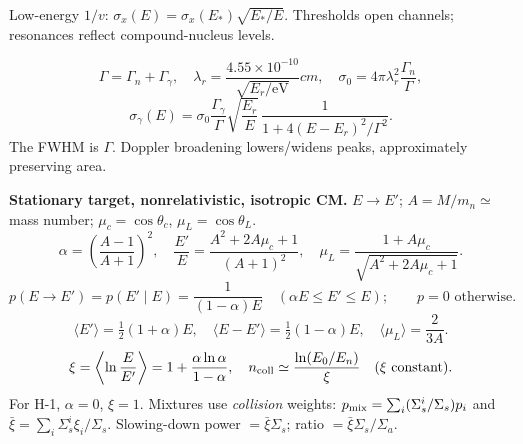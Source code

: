 \begin{handoutcolumns}
Low-energy $1/v$: $\sigma_x(E)=\sigma_x(E_*)\sqrt{E_*/E}$.
Thresholds open channels; resonances reflect compound-nucleus levels.

\[
 \Gamma=\Gamma_n+\Gamma_\gamma,\quad
 \lambda_r=\frac{4.55\times10^{-10}}{\sqrt{E_r/\mathrm{eV}}}\unit{cm},
 \quad \sigma_0=4\pi\lambda_r^2\frac{\Gamma_n}{\Gamma},
\]
\[
 \sigma_\gamma(E)=\sigma_0\frac{\Gamma_\gamma}{\Gamma}
 \sqrt{\frac{E_r}{E}}\,
 \frac{1}{1+4(E-E_r)^2/\Gamma^2}.
\]
The FWHM
is $\Gamma$. Doppler broadening lowers/widens peaks, approximately
preserving area.

\textbf{Stationary target, nonrelativistic, isotropic CM.}
$E\to E'$; $A=M/m_n\simeq$ mass number;
$\mu_c=\cos\theta_c$, $\mu_L=\cos\theta_L$.
\[
 \alpha=\left(\frac{A-1}{A+1}\right)^2,\quad
 \frac{E'}E=\frac{A^2+2A\mu_c+1}{(A+1)^2},\quad
 \mu_L=\frac{1+A\mu_c}{\sqrt{A^2+2A\mu_c+1}}.
\]
\[
 p(E\to E') = p(E'\mid E)=\frac{1}{(1-\alpha)E}\quad(\alpha E\le E'\le E);
 \qquad p=0\text{ otherwise}.
\]
\[
 \langle E'\rangle=\tfrac12(1+\alpha)E,\quad
 \langle E-E'\rangle=\tfrac12(1-\alpha)E,\quad
 \langle\mu_L\rangle=\frac{2}{3A}.
\]
\[
 \xi=\left\langle\ln\frac{E}{E'}\right\rangle
 =1+\frac{\alpha\ln\alpha}{1-\alpha},\quad
 n_{\rm coll}\simeq\frac{\ln(E_0/E_n)}{\xi}\quad(\xi\text{ constant}).
\]
For H-1, $\alpha=0$, $\xi=1$. Mixtures use \emph{collision} weights:
$p_{\rm mix}=\sum_i(\Sigma_s^i/\Sigma_s)p_i$ and
$\bar\xi=\sum_i\Sigma_s^i\xi_i/\Sigma_s$.
Slowing-down power $=\bar\xi\Sigma_s$; ratio $=\bar\xi\Sigma_s/\Sigma_a$.
\end{handoutcolumns}


